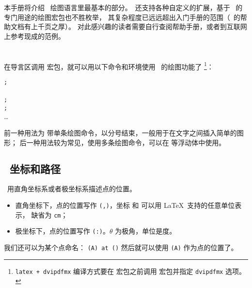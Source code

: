 本手册将介绍 \TikZ\ 绘图语言里最基本的部分。\TikZ\ 还支持各种自定义的扩展，基于 \TikZ\ 的专门用途的绘图宏包也不胜枚举，
其复杂程度已远远超出入门手册的范围（\TikZ\ 的帮助文档有上千页之厚）。
对此感兴趣的读者需要自行查阅帮助手册，或者到互联网上参考现成的范例。

\section{\TikZ}\label{sec:tikz}

在导言区调用  宏包，就可以用以下命令和环境使用 \TikZ\ 的绘图功能了%
\footnote{\texttt{latex + dvipdfmx} 编译方式要在  宏包之前调用  宏包并指定 \texttt{dvipdfmx} 选项。}：
\begin{command}
\oarg*{\ldots} \texttt{;} \\[1ex]
\oarg*{\ldots} \\
\texttt{;} \\
\texttt{;} \\
\ldots \\
\end{command}

前一种用法为  带单条绘图命令，以分号结束，一般用于在文字之间插入简单的图形；
后一种用法较为常见，使用多条绘图命令，可以在  等浮动体中使用。

\subsection{\TikZ\ 坐标和路径}\label{subsec:tikz-path}

\TikZ\ 用直角坐标系或者极坐标系描述点的位置。
\begin{itemize}
  \item 直角坐标下，点的位置写作 \texttt{(,)}，坐标  和  可以用 \LaTeX\ 支持的任意单位表示，
  缺省为 \texttt{cm}；
  \item 极坐标下，点的位置写作 \texttt{(\Arg{$\theta$}:)}。$\theta$ 为极角，单位是度。
\end{itemize}

我们还可以为某个点命名： \texttt{(A) at ()} 
然后就可以使用 \texttt{(A)} 作为点的位置了。

\begin{example}
\end{example}

